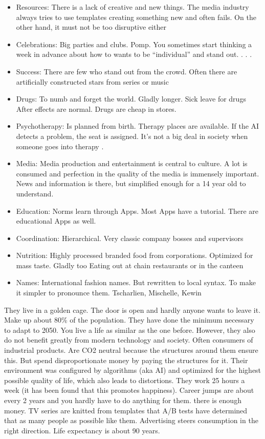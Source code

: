 \begin{itemize}
    \item Resources: There is a lack of creative and new things. The media industry always tries to use templates creating something new and often fails. On the other hand, it must not be too disruptive either
    \item Celebrations: Big parties and clubs. Pomp. You sometimes start thinking a week in advance about how to wants to be “individual” and stand out. . . .
    \item Success: There are few who stand out from the crowd. Often there are artificially constructed stars from series or music
    \item Drugs: To numb and forget the world. Gladly longer. Sick leave for drugs After effects are normal. Drugs are cheap in stores.
    \item Psychotherapy: Is planned from birth. Therapy places are available. If the AI detects a problem, the seat is assigned. It's not a big deal in society when someone goes into therapy .
    \item Media: Media production and entertainment is central to culture. A lot is consumed and perfection in the quality of the media is immensely important. News and information is there, but simplified enough for a 14 year old to understand.
    \item Education: Norms learn through Apps. Most Apps have a tutorial. There are educational Apps as well.
    \item Coordination: Hierarchical. Very classic company bosses and supervisors
    \item Nutrition: Highly processed branded food from corporations. Optimized for mass taste. Gladly too Eating out at chain restaurants or in the canteen
    \item Names: International fashion names. But rewritten to local syntax. To make it simpler to pronounce them. Tscharlien, Mischelle, Kewin
\end{itemize}

They live in a golden cage. The door is open and hardly anyone wants to leave it.
Make up about 80\% of the population. They have done the minimum necessary to adapt to 2050. You live  a life as similar as the one before. However, they also do not benefit greatly from modern technology and society. Often consumers of industrial products. Are CO2 neutral because the structures around them ensure this. But spend disproportionate money by paying the structures for it. Their environment was configured by algorithms (aka AI) and optimized for the highest possible quality of life, which also leads to distortions. They work 25 hours a week (it has been found that this promotes happiness). Career jumps are about every 2 years and you hardly have to do anything for them. there is enough money. TV series are knitted from templates that A/B tests have determined that as many people as possible like them. Advertising steers consumption in the right direction. Life expectancy is about 90 years.

